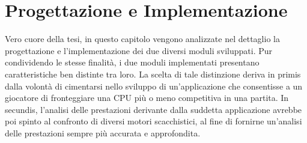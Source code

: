 \chapter{Progettazione e Implementazione} %
%

\begin{citazione}
Vero cuore della tesi, in questo capitolo vengono analizzate nel dettaglio la progettazione e l'implementazione dei due diversi moduli sviluppati. Pur condividendo le stesse finalità, i due moduli implementati presentano caratteristiche ben distinte tra loro. La scelta di tale distinzione deriva in primis dalla volontà di cimentarsi nello sviluppo di un'applicazione che consentisse a un giocatore di fronteggiare una CPU più o meno competitiva in una partita. In secundis, l'analisi delle prestazioni derivante dalla suddetta applicazione avrebbe poi spinto al confronto di diversi motori scacchistici, al fine di fornirne un'analisi delle prestazioni sempre più accurata e approfondita.
\end{citazione}

